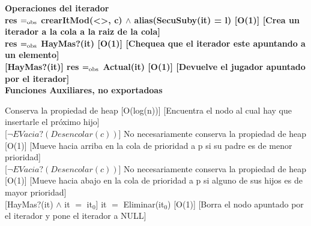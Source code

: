 \bf{Operaciones del iterador}
\\
{res $=_{\mathrm{obs}}$ crearItMod(<>, c) $\wedge$ alias(SecuSuby(it) = l)}
[O(1)]
[Crea un iterador a la cola a la raiz de la cola]\\

{res $=_{\mathrm{obs}}$ HayMas?(it)}
[O(1)]
[Chequea que el iterador este apuntando a un elemento]\\

[HayMas?(it)]
{res $=_{\mathrm{obs}}$ Actual(it)}
[O(1)]
[Devuelve el jugador apuntado por el iterador]\\

\bf{Funciones Auxiliares, no exportadoas}

{Conserva la propiedad de heap}
[O(log(n))]
[Encuentra el nodo al cual hay que insertarle el próximo hijo]\\

[$\neg EVacia?(Desencolar(c))$]
{No necesariamente conserva la propiedad de heap}
[O(1)]
[Mueve hacia arriba en la cola de prioridad a p si su padre es de menor prioridad]\\

[$\neg EVacia?(Desencolar(c))$]
{No necesariamente conserva la propiedad de heap}
[O(1)]
[Mueve hacia abajo en la cola de prioridad a p si alguno de sus hijos es de mayor prioridad]\\

[HayMas?(it) $\wedge$ it $=$ it$_0$]
{it $=$ Eliminar(it$_0$)}
[O(1)]
[Borra el nodo apuntado por el iterador y pone el iterador a NULL]\\



